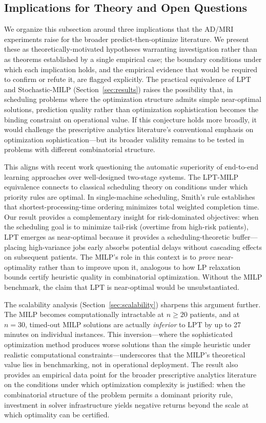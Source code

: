 \documentclass[11pt,a4paper]{article}
\begin{document}
\subsection{Implications for Theory and Open Questions}
\label{sec:theory}

We organize this subsection around three implications that the AD/MRI experiments raise for the broader predict-then-optimize literature. We present these as theoretically-motivated hypotheses warranting investigation rather than as theorems established by a single empirical case; the boundary conditions under which each implication holds, and the empirical evidence that would be required to confirm or refute it, are flagged explicitly. The practical equivalence of LPT and Stochastic-MILP (Section~\ref{sec:results}) raises the possibility that, in scheduling problems where the optimization structure admits simple near-optimal solutions, prediction quality rather than optimization sophistication becomes the binding constraint on operational value. If this conjecture holds more broadly, it would challenge the prescriptive analytics literature's conventional emphasis on optimization sophistication---but its broader validity remains to be tested in problems with different combinatorial structure.

This aligns with recent work questioning the automatic superiority of end-to-end learning approaches over well-designed two-stage systems. The LPT-MILP equivalence connects to classical scheduling theory on conditions under which priority rules are optimal. In single-machine scheduling, Smith's rule establishes that shortest-processing-time ordering minimizes total weighted completion time. Our result provides a complementary insight for risk-dominated objectives: when the scheduling goal is to minimize tail-risk (overtime from high-risk patients), LPT emerges as near-optimal because it provides a scheduling-theoretic buffer---placing high-variance jobs early absorbs potential delays without cascading effects on subsequent patients. The MILP's role in this context is to \textit{prove} near-optimality rather than to improve upon it, analogous to how LP relaxation bounds certify heuristic quality in combinatorial optimization. Without the MILP benchmark, the claim that LPT is near-optimal would be unsubstantiated.

The scalability analysis (Section~\ref{sec:scalability}) sharpens this argument further. The MILP becomes computationally intractable at $n \geq 20$ patients, and at $n = 30$, timed-out MILP solutions are actually \textit{inferior} to LPT by up to 27 minutes on individual instances. This inversion---where the sophisticated optimization method produces worse solutions than the simple heuristic under realistic computational constraints---underscores that the MILP's theoretical value lies in benchmarking, not in operational deployment. The result also provides an empirical data point for the broader prescriptive analytics literature on the conditions under which optimization complexity is justified: when the combinatorial structure of the problem permits a dominant priority rule, investment in solver infrastructure yields negative returns beyond the scale at which optimality can be certified.
\end{document}
